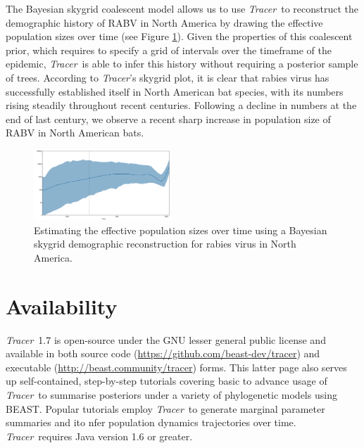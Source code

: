\documentclass{bioinfo}
\newcommand{\tracer}{\emph{Tracer}}
\begin{document}
The Bayesian skygrid coalescent model \citep{gill2012improving} allows us to use \tracer\ to reconstruct the demographic history of RABV in North America by drawing the effective population sizes over time (see Figure \ref{fig:rabv}).
Given the properties of this coalescent prior, which requires to specify a grid of intervals over the timeframe of the epidemic, \tracer\ is able to infer this history without requiring a posterior sample of trees.
According to \tracer's skygrid plot, it is clear that rabies virus has successfully established itself in North American bat species, with its numbers rising steadily throughout recent centuries.
Following a decline in numbers at the end of last century, we observe a recent sharp increase in population size of RABV in North American bats.


\begin{figure}[ht]
\centerline{
\includegraphics[width=0.46\textwidth]{./figures/rabv-skygrid.pdf}
}
\caption{Estimating the effective population sizes over time using a Bayesian skygrid demographic reconstruction for rabies virus in North America.}
\label{fig:rabv}
\end{figure}



\section*{Availability}

\tracer\ 1.7 is open-source under the GNU lesser general public license and available in both source code (\url{https://github.com/beast-dev/tracer}) and executable (\url{http://beast.community/tracer}) forms.
This latter page also serves up self-contained, step-by-step tutorials covering basic to advance usage of \tracer\ to summarise posteriors under a variety of phylogenetic models using BEAST.
Popular tutorials employ \tracer\ to generate marginal parameter summaries and ito nfer population dynamics trajectories over time.
\tracer\ requires Java version 1.6 or greater.
\end{document}
